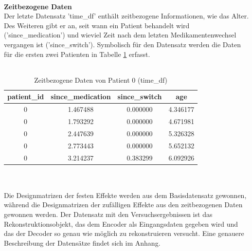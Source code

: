 \documentclass[%
thesis=student,%
coverpage=false,%
titlepage=false,%
headmarks=true, %
german,%
font=libertine, %
math=newpxtx, %
BCOR=5mm,%
coverBCOR=11mm%
]{tumbook}
\theoremstyle{break}
\begin{document}
\\
\textbf{Zeitbezogene Daten} \\
Der letzte Datensatz 'time\_df' enthält zeitbezogene Informationen, wie das Alter. Des Weiteren gibt er an, seit wann ein Patient behandelt wird ('since\_medication') und wieviel Zeit nach dem letzten Medikamentenwechsel vergangen ist ('since\_switch'). Symbolisch für den Datensatz werden die Daten für die ersten zwei Patienten in Tabelle \ref{table:time_df} erfasst.\\
\\
\begin{table}[ht]
	\centering
	\small
	\begin{tabular}{|c|c|c|c|}
		\hline
		patient\_id & since\_medication & since\_switch & age \\
		\hline
		0 & 1.467488 & 0.000000 & 4.346177 \\
		0 & 1.793292 & 0.000000 & 4.671981 \\
		0 & 2.447639 & 0.000000 & 5.326328 \\
		0 & 2.773443 & 0.000000 & 5.652132 \\
		0 & 3.214237 & 0.383299 & 6.092926 \\
		\hline
	\end{tabular}
	\caption{Zeitbezogene Daten von Patient 0 (time\_df)}
	\label{table:time_df}
\end{table}
\\
\\
Die Designmatrizen der festen Effekte werden aus dem Basisdatensatz gewonnen, während die Designmatrizen der zufälligen Effekte aus den zeitbezogenen Daten gewonnen werden. Der Datensatz mit den Versuchsergebnissen ist das Rekonstruktionsobjekt, das dem Encoder als Eingangsdaten gegeben wird und das der Decoder so genau wie möglich zu rekonstruieren versucht. Eine genauere Beschreibung der Datensätze findet sich im Anhang.\\
\\
\end{document}
